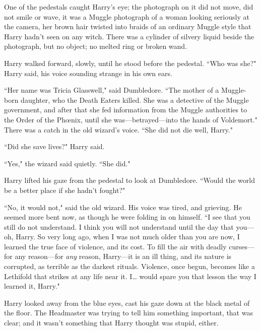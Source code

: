 One of the pedestals caught Harry's eye; the photograph on it did not move, did not smile or wave, it was a Muggle photograph of a woman looking seriously at the camera, her brown hair twisted into braids of an ordinary Muggle style that Harry hadn't seen on any witch. There was a cylinder of silvery liquid beside the photograph, but no object; no melted ring or broken wand.

Harry walked forward, slowly, until he stood before the pedestal. ``Who was she?" Harry said, his voice sounding strange in his own ears.

``Her name was Tricia Glasswell," said Dumbledore. ``The mother of a Muggle-born daughter, who the Death Eaters killed. She was a detective of the Muggle government, and after that she fed information from the Muggle authorities to the Order of the Phœnix, until she was---betrayed---into the hands of Voldemort." There was a catch in the old wizard's voice. ``She did not die well, Harry."

``Did she save lives?" Harry said.

``Yes," the wizard said quietly. ``She did."

Harry lifted his gaze from the pedestal to look at Dumbledore. ``Would the world be a better place if she hadn't fought?"

``No, it would not," said the old wizard. His voice was tired, and grieving. He seemed more bent now, as though he were folding in on himself. ``I see that you still do not understand. I think you will not understand until the day that you---oh, Harry. So very long ago, when I was not much older than you are now, I learned the true face of violence, and its cost. To fill the air with deadly curses---for any reason---for \emph{any} reason, Harry---it is an ill thing, and its nature is corrupted, as terrible as the darkest rituals. Violence, once begun, becomes like a Lethifold that strikes at any life near it. I{\ldots} would spare you that lesson the way I learned it, Harry."

Harry looked away from the blue eyes, cast his gaze down at the black metal of the floor. The Headmaster was trying to tell him something important, that was clear; and it wasn't something that Harry thought was stupid, either.

